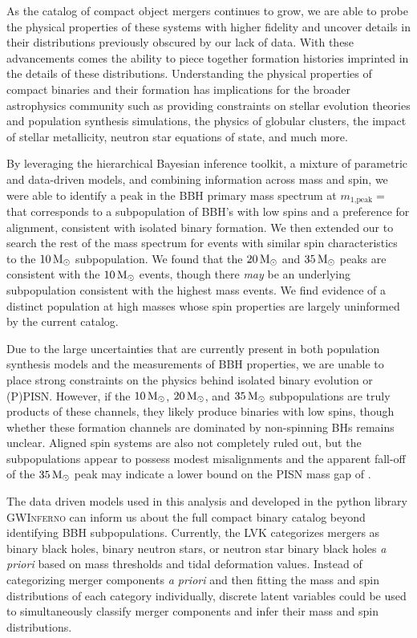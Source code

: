 As the catalog of compact object mergers continues to grow, we are able to probe the physical properties of these systems with higher fidelity and uncover details in their distributions previously obscured by our lack of data. With these advancements comes the ability to piece together formation histories imprinted in the details of these distributions. Understanding the physical properties of compact binaries and their formation has implications for the broader astrophysics community such as providing constraints on stellar evolution theories and population synthesis simulations, the physics of globular clusters, the impact of stellar metallicity, neutron star equations of state, and much more.

By leveraging the hierarchical Bayesian inference toolkit, a mixture of parametric and data-driven models, and combining information across mass and spin, we were able to identify a peak in the BBH primary mass spectrum at $m_\text{1,peak} = $ \result{$\CIPlusMinus{\macros[Mass][Base][PeakA][max]}$ \msun} that corresponds to a subpopulation of BBH's with low spins and a preference for alignment, consistent with isolated binary formation. We then extended our \base{} to search the rest of the mass spectrum for events with similar spin characteristics to the $10{\,\rm M}_\odot$ subpopulation. We found that the $20{\,\rm M}_\odot$ and $35{\,\rm M}_\odot$ peaks are consistent with the $10{\,\rm M}_\odot$ events, though there \textit{may} be an underlying subpopulation consistent with the highest mass events. We find evidence of a distinct population at high masses whose spin properties are largely uninformed by the current catalog.

Due to the large uncertainties that are currently present in both population synthesis models and the measurements of BBH properties, we are unable to place strong constraints on the physics behind isolated binary evolution or (P)PISN. However, if the $10{\,\rm M}_\odot$, $20{\,\rm M}_\odot$, and $35{\,\rm M}_\odot$ subpopulations are truly products of these channels, they likely produce binaries with low spins, though whether these formation channels are dominated by non-spinning BHs remains unclear. Aligned spin systems are also not completely ruled out, but the subpopulations appear to possess modest misalignments and the apparent fall-off of the $35{\,\rm M}_\odot$ peak may indicate a lower bound on the PISN mass gap of \result{$\CIPlusMinus{\macros[Mass][Composite][ContinuumA][99percentile]}$ \msun}.

The data driven models used in this analysis and developed in the python library \textsc{GWInferno} can inform us about the full compact binary catalog beyond identifying BBH subpopulations. Currently, the LVK categorizes mergers as binary black holes, binary neutron stars, or neutron star binary black holes \emph{a priori} based on mass thresholds and tidal deformation values. Instead of categorizing merger components \emph{a priori} and then fitting the mass and spin distributions of each category individually, discrete latent variables could be used to simultaneously classify merger components and infer their mass and spin distributions.

